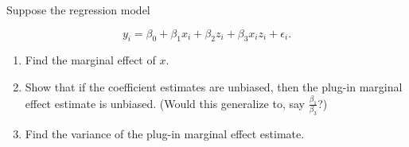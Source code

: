 \documentclass[border=3bp]{standalone}
\begin{document}
\begin{minipage}{3.5in}
Suppose the regression model

$$
y_i = \beta_0 + \beta_1 x_i + \beta_2 z_i + \beta_3 x_i z_i + \epsilon_i.
$$

\begin{enumerate}
\item Find the marginal effect of $x$.
\item Show that if the coefficient estimates are unbiased, then the plug-in marginal effect estimate is unbiased. (Would this generalize to, say $\frac{\beta_1}{\beta_3}$?)
\item Find the variance of the plug-in marginal effect estimate.
\end{enumerate}
\end{minipage}
\end{document}
